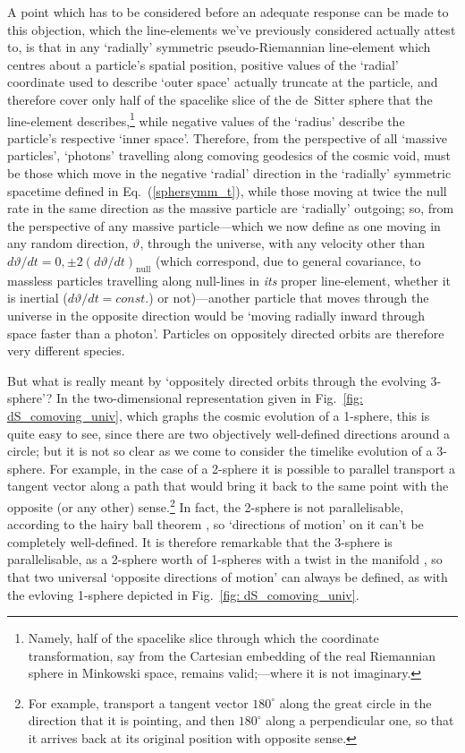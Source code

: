 A point which has to be considered before an adequate response can be made to this objection, which the line-elements we've previously considered actually attest to, is that in any `radially' symmetric pseudo-Riemannian line-element which centres about a particle's spatial position, positive values of the `radial' coordinate used to describe `outer space' actually truncate at the particle, and therefore cover only half of the spacelike slice of the de~Sitter sphere that the line-element describes,\footnote{Namely, half of the spacelike slice through which the coordinate transformation, say from the Cartesian embedding of the real Riemannian sphere in Minkowski space, remains valid;---where it is not imaginary.} while negative values of the `radius' describe the particle's respective `inner space'. Therefore, from the perspective of all `massive particles', `photons' travelling along comoving geodesics of the cosmic void, must be those which move in the negative `radial' direction in the `radially' symmetric spacetime defined in Eq.~(\ref{sphersymm_t}), while those moving at twice the null rate in the same direction as the massive particle are `radially' outgoing; so, from the perspective of any massive particle---which we now define as one moving in any random direction, $\vartheta$, through the universe, with any velocity other than $d\vartheta/dt=0,\pm2(d\vartheta/dt)_{\mathrm{null}}$ (which correspond, due to general covariance, to massless particles travelling along null-lines in \textit{its} proper line-element, whether it is inertial ($d\vartheta/dt=const.$) or not)---another particle that moves through the universe in the opposite direction would be `moving radially inward through space faster than a photon'. Particles on oppositely directed orbits are therefore very different species.

But what is really meant by `oppositely directed orbits through the evolving 3-sphere'? In the two-dimensional representation given in Fig.~\ref{fig: dS_comoving_univ}, which graphs the cosmic evolution of a 1-sphere, this is quite easy to see, since there are two objectively well-defined directions around a circle; but it is not so clear as we come to consider the timelike evolution of a 3-sphere. For example, in the case of a 2-sphere it is possible to parallel transport a tangent vector along a path that would bring it back to the same point with the opposite (or any other) sense.\footnote{For example, transport a tangent vector $180^{\circ}$ along the great circle in the direction that it is pointing, and then $180^{\circ}$ along a perpendicular one, so that it arrives back at its original position with opposite sense.} In fact, the 2-sphere is not parallelisable, according to the hairy ball theorem \cite{Milnor1978}, so `directions of motion' on it can't be completely well-defined. It is therefore remarkable that the 3-sphere is parallelisable, as a 2-sphere worth of 1-spheres with a twist in the manifold \cite{Christian2011}, so that two universal `opposite directions of motion' can always be defined, as with the evloving 1-sphere depicted in Fig.~\ref{fig: dS_comoving_univ}. 

